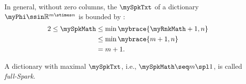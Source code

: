 In general, without zero columns, the $\mySpkTxt$ of a dictionary $\myPhi \ssin \mathbb{R}^{m \stimes n}$ is bounded by \cite{Donoho2003}:
\begin{equation}
\label{eq:spark-bounds}
\begin{aligned}
2 \leq \mySpkMath
&\leq \min \mybrace{\myRnkMath + 1 , n} \\
&\leq \min \mybrace{m + 1 ,n} \\
&= m + 1.
\end{aligned}
\end{equation}

A dictionary with maximal $\mySpkTxt$, i.e., $\mySpkMath \seq m \spl 1$, is called \emph{full-Spark}.